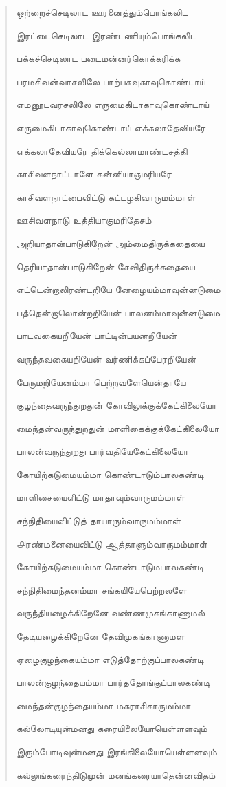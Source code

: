 \documentclass{article}
\begin{document}
\begin{quotation}
{ஒற்றைச்செடிலாட ஊரனைத்தும்பொங்கலிட

இரட்டைசெடிலாட இரண்டணியும்பொங்கலிட

பக்கச்செடிலாட படைமன்னர்கொக்கரிக்க

பரமசிவன்வாசலிலே பாற்பசுவுகாவுகொண்டாய்

எமனூடவரசலிலே எருமைகிடாகாவுகொண்டாய்

எருமைகிடாகாவுகொண்டாய் எக்கலாதேவியரே

எக்கலாதேவியரே திக்கெல்லாமாண்டசத்தி

காசிவளநாட்டாளே கன்னியாகுமரியரே

காசிவளநாட்பைவிட்டு கட்டழகிவாருமம்மாள்

ஊசிவளநாடு உத்தியாகுமரிதேசம்

அறியாதான்பாடுகிறேன் அம்மைதிருக்கதையை

தெரியாதான்பாடுகிறேன் சேவிதிருக்கதையை

எட்டென்றாலிரண்டறியே னேழையம்மாவுன்னடுமை

பத்தென்றாலொன்றறியேன் பாலனம்மாவுன்னடுமை

பாடவகையறியேன் பாட்டின்பயனறியேன்

வருந்தவகையறியேன் வர்ணிக்கப்பேரறியேன்

பேருமறியேனம்மா பெற்றவளேயென்தாயே

குழந்தைவருந்துறதுன் கோவிலுக்குக்கேட்கிலையோ

மைந்தன்வருந்துறதுன் மாளிகைக்குக்கேட்கிலையோ

பாலன்வருந்துறது பார்வதியேகேட்கிலையோ

கோயிற்கடுமையம்மா கொண்டாடும்பாலகண்டி

மாளிசையைஎிட்டு மாதாவும்வாருமம்மாள்

சந்நிதியைவிட்டுத் தாயாரும்வாருமம்மாள்

௮ரண்மனையைவிட்டு ஆத்தாளும்வாருமம்மாள்

கோயிற்கடுமையம்மா கொண்டாடுமபாலகண்டி

சந்நிதிமைந்தனம்மா சங்கயியேபெற்றலளே

வருந்தியழைக்கிறேனே வண்ணமுகங்காணாமல்

தேடியழைக்கிறேனே தேவிமுகங்காணாமள

ஏழைகுழந்கையம்மா எடுத்தோற்குப்பாலகண்டி

பாலன்குழந்தையம்மா பார்ததோங்குப்பாலகண்டி

மைந்தன்குழந்தையம்மா மகராசிகாருமம்மா

கல்லோடியுன்மனது கரையிலையோயெள்ளளவும்

இரும்போடிவுன்மனது இரங்கிலையோயெள்ளளவும்

கல்லுங்கரைந்திடுமுன் மனங்கரையாதென்னவிதம்

}
\end{quotation}
\end{document}
